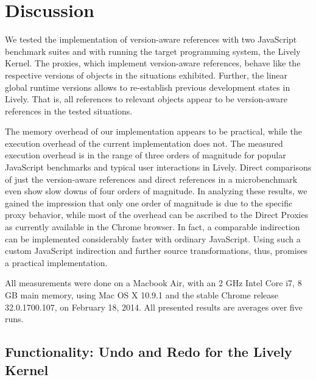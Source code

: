 
\chapter{Discussion} \label{chapter:DISCUSSION}

We tested the implementation of version-aware references with two JavaScript benchmark suites and with running the target programming system, the Lively Kernel.
The proxies, which implement version-aware references, behave like the respective versions of objects in the situations exhibited.
Further, the linear global runtime versions allows to re-establish previous development states in Lively.
That is, all references to relevant objects appear to be version-aware references in the tested situations.

The memory overhead of our implementation appears to be practical, while the execution overhead of the current implementation does not.
The measured execution overhead is in the range of three orders of magnitude for popular JavaScript benchmarks and typical user interactions in Lively.
Direct comparisons of just the version-aware references and direct references in a microbenchmark even show slow downs of four orders of magnitude.
In analyzing these results, we gained the impression that only one order of magnitude is due to the specific proxy behavior, while most of the overhead can be ascribed to the Direct Proxies as currently available in the Chrome browser.
In fact, a comparable indirection can be implemented considerably faster with ordinary JavaScript.
Using such a custom JavaScript indirection and further source transformations, thus, promises a practical implementation.

All measurements were done on a Macbook Air, with an 2 GHz Intel Core i7, 8 GB main memory, using Mac OS X 10.9.1 and the stable Chrome release 32.0.1700.107, on February 18, 2014.
All presented results are averages over five runs.


\section{Functionality: Undo and Redo for the Lively Kernel}


